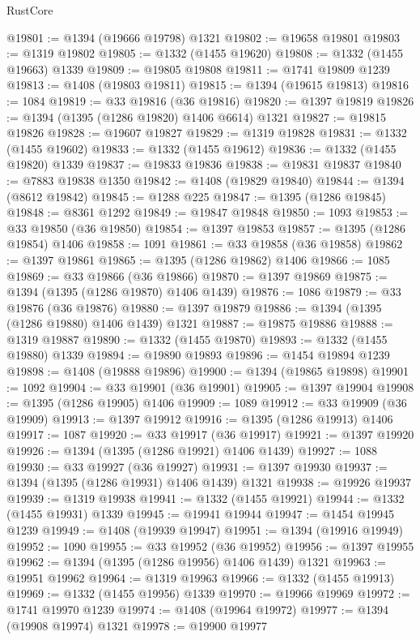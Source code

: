 \begin{lexlean}{RustCore}
\begin{coremodule}
@19801 := @1394 (@19666 @19798) @1321
@19802 := @19658 @19801
@19803 := @1319 @19802
@19805 := @1332 (@1455 @19620)
@19808 := @1332 (@1455 @19663) @1339
@19809 := @19805 @19808
@19811 := @1741 @19809 @1239
@19813 := @1408 (@19803 @19811)
@19815 := @1394 (@19615 @19813)
@19816 := 1084
@19819 := @33 @19816 (@36 @19816)
@19820 := @1397 @19819
@19826 := @1394 (@1395 (@1286 @19820) @1406 @6614) @1321
@19827 := @19815 @19826
@19828 := @19607 @19827
@19829 := @1319 @19828
@19831 := @1332 (@1455 @19602)
@19833 := @1332 (@1455 @19612)
@19836 := @1332 (@1455 @19820) @1339
@19837 := @19833 @19836
@19838 := @19831 @19837
@19840 := @7883 @19838 @1350
@19842 := @1408 (@19829 @19840)
@19844 := @1394 (@8612 @19842)
@19845 := @1288 @225
@19847 := @1395 (@1286 @19845)
@19848 := @8361 @1292
@19849 := @19847 @19848
@19850 := 1093
@19853 := @33 @19850 (@36 @19850)
@19854 := @1397 @19853
@19857 := @1395 (@1286 @19854) @1406
@19858 := 1091
@19861 := @33 @19858 (@36 @19858)
@19862 := @1397 @19861
@19865 := @1395 (@1286 @19862) @1406
@19866 := 1085
@19869 := @33 @19866 (@36 @19866)
@19870 := @1397 @19869
@19875 := @1394 (@1395 (@1286 @19870) @1406 @1439)
@19876 := 1086
@19879 := @33 @19876 (@36 @19876)
@19880 := @1397 @19879
@19886 := @1394 (@1395 (@1286 @19880) @1406 @1439) @1321
@19887 := @19875 @19886
@19888 := @1319 @19887
@19890 := @1332 (@1455 @19870)
@19893 := @1332 (@1455 @19880) @1339
@19894 := @19890 @19893
@19896 := @1454 @19894 @1239
@19898 := @1408 (@19888 @19896)
@19900 := @1394 (@19865 @19898)
@19901 := 1092
@19904 := @33 @19901 (@36 @19901)
@19905 := @1397 @19904
@19908 := @1395 (@1286 @19905) @1406
@19909 := 1089
@19912 := @33 @19909 (@36 @19909)
@19913 := @1397 @19912
@19916 := @1395 (@1286 @19913) @1406
@19917 := 1087
@19920 := @33 @19917 (@36 @19917)
@19921 := @1397 @19920
@19926 := @1394 (@1395 (@1286 @19921) @1406 @1439)
@19927 := 1088
@19930 := @33 @19927 (@36 @19927)
@19931 := @1397 @19930
@19937 := @1394 (@1395 (@1286 @19931) @1406 @1439) @1321
@19938 := @19926 @19937
@19939 := @1319 @19938
@19941 := @1332 (@1455 @19921)
@19944 := @1332 (@1455 @19931) @1339
@19945 := @19941 @19944
@19947 := @1454 @19945 @1239
@19949 := @1408 (@19939 @19947)
@19951 := @1394 (@19916 @19949)
@19952 := 1090
@19955 := @33 @19952 (@36 @19952)
@19956 := @1397 @19955
@19962 := @1394 (@1395 (@1286 @19956) @1406 @1439) @1321
@19963 := @19951 @19962
@19964 := @1319 @19963
@19966 := @1332 (@1455 @19913)
@19969 := @1332 (@1455 @19956) @1339
@19970 := @19966 @19969
@19972 := @1741 @19970 @1239
@19974 := @1408 (@19964 @19972)
@19977 := @1394 (@19908 @19974) @1321
@19978 := @19900 @19977

\end{coremodule}
\end{lexlean}
